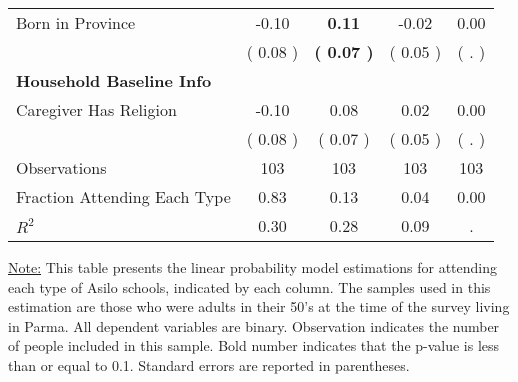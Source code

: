 \begin{table}[H]
{\begin{tabular}{lcccc}
\quad Born in Province &     -0.10 & \textbf{     0.11} &     -0.02 &      0.00 \\
\quad  & (     0.08 ) & \textbf{(     0.07 )}  & (     0.05 )  & (        . )  \\
\midrule
\textbf{Household Baseline Info} \\
\quad Caregiver Has Religion &     -0.10 &      0.08 &      0.02 &      0.00 \\
\quad  & (     0.08 ) & (     0.07 )  & (     0.05 )  & (        . )  \\
\midrule
Observations & 103 & 103 & 103 & 103 \\
Fraction Attending Each Type &      0.83 &      0.13 &      0.04 &      0.00 \\
\midrule
$ R^2$ &      0.30 &      0.28 &      0.09 &         . \\
\bottomrule
\end{tabular}}
\end{table}
\begin{scriptsize}
\noindent\underline{Note:} This table presents the linear probability model estimations for attending each type of Asilo schools, indicated by each column. The samples used in this estimation are those who were adults in their 50's at the time of the survey living in Parma. All dependent variables are binary. Observation indicates the number of people included in this sample. Bold number indicates that the p-value is less than or equal to 0.1. Standard errors are reported in parentheses.
\end{scriptsize}
